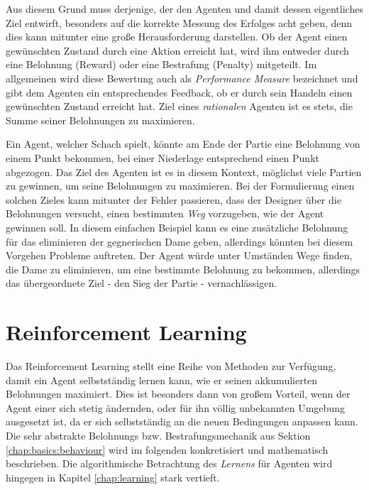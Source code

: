 	Aus diesem Grund muss derjenige, der den Agenten und damit dessen eigentliches Ziel entwirft, besonders auf die korrekte Messung des Erfolges acht geben, denn dies kann mitunter eine große Herausforderung darstellen. 
	Ob der Agent einen gewünschten Zustand durch eine Aktion erreicht hat, wird ihm entweder durch eine Belohnung (Reward) oder eine Bestrafung (Penalty) mitgeteilt. Im allgemeinen wird diese Bewertung auch als \textit{Performance Measure} bezeichnet und gibt dem Agenten ein entsprechendes Feedback, ob er durch sein Handeln einen gewünschten Zustand erreicht hat.
	Ziel eines \textit{rationalen} Agenten ist es stets, die Summe seiner Belohnungen zu maximieren.  
	
	Ein Agent, welcher \zB Schach spielt, könnte am Ende der Partie eine Belohnung von einem Punkt bekommen, bei einer Niederlage entsprechend einen Punkt abgezogen. Das Ziel des Agenten ist es in diesem Kontext, möglichst viele Partien zu gewinnen, um seine Belohnungen zu maximieren. 
	Bei der Formulierung einen solchen Zieles kann mitunter der Fehler passieren, dass der Designer über die Belohnungen versucht, einen bestimmten \textit{Weg} vorzugeben, wie der Agent gewinnen soll. In diesem einfachen Beispiel kann es \zB eine zusätzliche Belohnung für das eliminieren der gegnerischen Dame geben, allerdings könnten bei diesem Vorgehen Probleme auftreten. Der Agent würde unter Umständen Wege finden, die Dame zu eliminieren, um eine bestimmte Belohnung zu bekommen, allerdings das übergeordnete Ziel - den Sieg der Partie - vernachlässigen.
	

\section{Reinforcement Learning}

	Das Reinforcement Learning stellt eine Reihe von Methoden zur Verfügung, damit ein Agent selbstständig lernen kann, wie er seinen akkumulierten Belohnungen maximiert. Dies ist besonders dann von großem Vorteil, wenn der Agent einer sich stetig ändernden, oder für ihn völlig unbekannten Umgebung ausgesetzt ist, da er sich selbstständig an die neuen Bedingungen anpassen kann. Die sehr abstrakte Belohnungs bzw. Bestrafungsmechanik aus Sektion \ref{chap:basics:behaviour} wird im folgenden konkretisiert und mathematisch beschrieben.
	Die algorithmische Betrachtung des \textit{Lernens} für Agenten wird hingegen in Kapitel \ref{chap:learning} stark vertieft.


